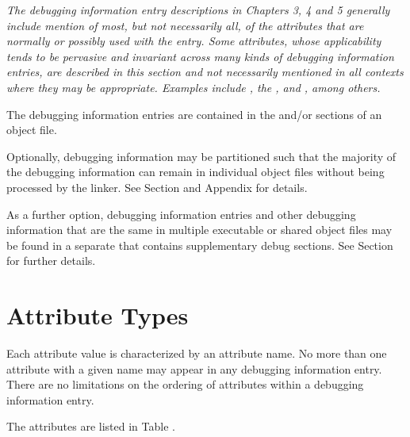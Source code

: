 \textit{The debugging information entry descriptions in
Chapters 3, 4 and 5 generally include mention of
most, but not necessarily all, of the attributes 
that are normally or possibly used with the entry.
Some attributes, whose applicability tends to be 
pervasive and invariant across many kinds of
debugging information entries, are described in 
this section and not necessarily mentioned in all
contexts where they may be appropriate. 
Examples include 
\DWATartificial, 
the , and 
\DWATdescription, 
among others.}

The debugging information entries are contained in the 
\dotdebuginfo{} and/or \dotdebuginfodwo{} sections of an object file.

Optionally, debugging information may be partitioned such
that the majority of the debugging information can remain in
individual object files without being processed by the
linker. See Section  and
Appendix  for details.

As a further option, debugging information entries and other debugging
information that are the same in multiple executable or shared object files 
may be found in a separate  that 
contains supplementary debug sections.
See Section  for
further details.
 
\section{Attribute Types}
\label{chap:attributetypes}
Each attribute value is characterized by an attribute name. 
No more than one attribute with a given name may appear in any
debugging information entry. 
There are no limitations on the
ordering of attributes within a debugging information entry.

The attributes are listed in Table .  

